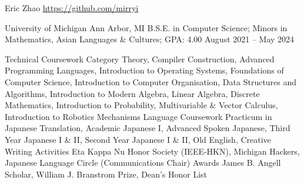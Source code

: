 \documentclass[letterpaper,11pt]{article}
\begin{document}
\rheading
  {Eric Zhao}
  {}
  {\href{https://github.com/mirryi}{https://github.com/mirryi}}
  {}

  \begin{rsectionlist}
    \rsectionitem
      {University of Michigan}
      {Ann Arbor, MI}
      {B.S.E. in Computer Science; Minors in Mathematics, Asian Languages \& Cultures; GPA: 4.00}
      {August 2021 -- May 2024}
      \begin{rpointlist}
        \rpoint
          {Technical Coursework}
          {Category Theory, Compiler Construction, Advanced Programming Languages,
            Introduction to Operating Systems, Foundations of Computer Science,
            Introduction to Computer Organisation, Data Structures and Algorithms,
            Introduction to Modern Algebra, Linear Algebra, Discrete Mathematics,
            Introduction to Probability, Multivariable \& Vector Calculus,
            Introduction to Robotics Mechanisms}
        \rpoint
          {Language Coursework}
          {Practicum in Japanese Translation, Academic Japanese I, Advanced Spoken Japanese,
            Third Year Japanese I \& II, Second Year Japanese I \& II,
            Old English, Creative Writing}
        \rpoint
          {Activities}
          {Eta Kappa Nu Honor Society (IEEE-HKN), Michigan Hackers,
            Japanese Language Circle (Communications Chair)}
        \rpoint
          {Awards}
          {James B. Angell Scholar, William J. Branstrom Prize, Dean's Honor List}
      \end{rpointlist}

  \end{rsectionlist}
\end{document}
